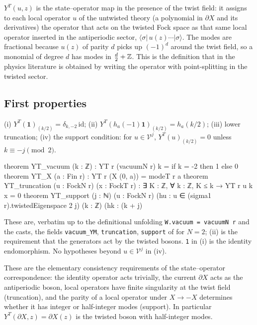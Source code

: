 \begin{physics}
$Y^T(u,z)$ is the state--operator map in the presence of the twist field: it assigns to each local operator $u$ of the untwisted theory (a polynomial in $\partial X$ and its derivatives) the operator that acts on the twisted Fock space as that same local operator inserted in the antiperiodic sector, $\langle\sigma|\,u(z)\cdots|\sigma\rangle$. The modes are fractional because $u(z)$ of parity $d$ picks up $(-1)^d$ around the twist field, so a monomial of degree $d$ has modes in $\tfrac d2+{\mathbb{Z}}$. This is the definition that in the physics literature is obtained by writing the operator with point-splitting in the twisted sector.
\end{physics}

\subsection{First properties}

\begin{theorem}\label{ch07:thm:YTbasic}
(i) $Y^T(\mathbf 1)_{(k/2)} = \delta_{k,-2}\,\mathrm{id}$; (ii) $Y^T(h_a(-1)\mathbf 1)_{(k/2)} =
h_a(k/2)$; (iii) lower truncation; (iv) the support condition: for $u\in\mathcal V^j$,
$Y^T(u)_{(k/2)} = 0$ unless $k\equiv -j\pmod2$.
\end{theorem}

\begin{leancode}
theorem YT_vacuum (k : ℤ) : YT r (vacuumN r) k = if k = -2 then 1 else 0
theorem YT_X (a : Fin r) : YT r (X (0, a)) = modeT r a
theorem YT_truncation (u : FockN r) (x : FockT r) :
    ∃ K : ℤ, ∀ k : ℤ, K ≤ k → YT r u k x = 0
theorem YT_support (j : ℕ) (u : FockN r) (hu : u ∈ (sigma1 r).twistedEigenspace 2 j)
    (k : ℤ) (hk : (k + j) %
\end{leancode}

\begin{dictionary}
These are, verbatim up to the definitional unfolding \verb|W.vacuum = vacuumN r| and the casts,
the fields \verb|vacuum_YM|, \verb|truncation|, \verb|support| of  for
$N=2$; (ii) is the requirement that the generators act by the twisted bosons. \verb|1| in (i) is
the identity endomorphism. No hypotheses beyond $u\in\mathcal V^j$ in (iv).
\end{dictionary}

\begin{physics}
These are the elementary consistency requirements of the state--operator correspondence: the identity operator acts trivially, the current $\partial X$ acts as the antiperiodic boson, local operators have finite singularity at the twist field (truncation), and the parity of a local operator under $X\to-X$ determines whether it has integer or half-integer modes (support). In particular $Y^T(\partial X,z)=\partial X(z)$ is the twisted boson with half-integer modes.
\end{physics}

